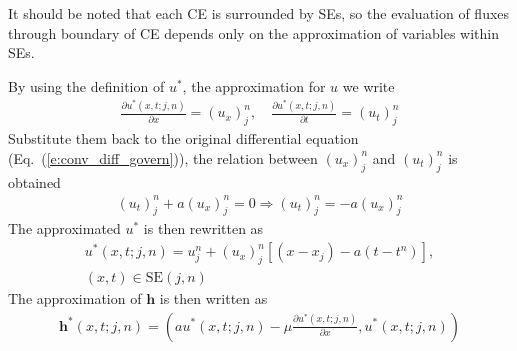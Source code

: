 \documentclass[11pt,dvips]{article}
\numberwithin{equation}{section}
\begin{document}
It should be noted that each CE is surrounded by SEs, so the evaluation of
fluxes through boundary of CE depends only on the approximation of variables
within SEs.

By using the definition of $u^*$, the approximation for $u$
we write
\begin{align*}
  \frac{\partial u^*(x,t;j,n)}{\partial x} = (u_x)_j^n, \quad
  \frac{\partial u^*(x,t;j,n)}{\partial t} = (u_t)_j^n
\end{align*}
Substitute them back to the original differential equation
(Eq.~(\ref{e:conv_diff_govern})), the relation between $(u_x)_j^n$ and
$(u_t)_j^n$ is obtained
\begin{align*}
              (u_t)_j^n + a(u_x)_j^n = 0
  \Rightarrow (u_t)_j^n = -a(u_x)_j^n
\end{align*}
The approximated $u^*$ is then rewritten as
\begin{gather*}
  u^*(x,t;j,n) = u_j^n + (u_x)_j^n[(x-x_j) - a(t-t^n)], \\
  (x,t) \in \mathrm{SE}(j,n)
\end{gather*}
The approximation of $\mathbf{h}$ is then written as
\begin{align*}
  \mathbf{h}^*(x,t;j,n) =
  \left(
    au^*(x,t;j,n)-\mu\frac{\partial u^*(x,t;j,n)}{\partial x}, u^*(x,t;j,n)
  \right)
\end{align*}
\end{document}
